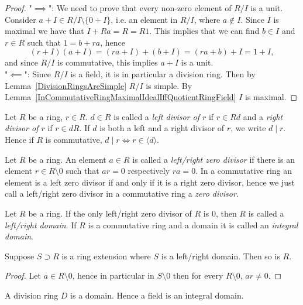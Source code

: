 \begin{proof}
    "$\implies$": We need to prove that every non-zero element of $R/I$ is a unit. Consider $a + I \in R/I\setminus \{0+I\}$, i.e. an element in $R/I$, where $a \notin I$. Since $I$ is maximal we have that $I+Ra = R = R1$. This implies that we can find $b\in I$ and $r \in R$ such that $1 = b + ra$, hence
    $$(r+I)(a+I) = (ra + I) + (b+I) = (ra+b)+I = 1 + I,$$
    and since $R/I$ is commutative, this implies $a+I$ is a unit.\\
    "$\impliedby$": Since $R/I$ is a field, it is in particular a division ring. Then by Lemma~\ref{DivisionRingsAreSimple} $R/I$ is simple. By Lemma~\ref{InCommutativeRingMaximalIdealIffQuotientRingField} $I$ is maximal.  
\end{proof}
\begin{definition}
    Let $R$ be a ring, $r\in R$. $d\in R$ is called a \textit{left divisor of $r$} if $r\in Rd$ and a \textit{right divisor of $r$} if $r\in dR$. If $d$ is both a left and a right divisor of $r$, we write $d\mid r$. Hence if $R$ is commutative, $d\mid r \iff r\in \langle d\rangle$.
\end{definition}
\begin{definition}
    Let $R$ be a ring. An element $a\in R$ is called a \textit{left/right zero divisor} if there is an element $r\in R\setminus 0$ such that $ar = 0$ respectively $ra = 0$. In a commutative ring an element is a left zero divisor if and only if it is a right zero divisor, hence we just call a left/right zero divisor in a commutative ring a \textit{zero divisor}.  
\end{definition}
\begin{definition}
    Let $R$ be a ring. If the only left/right zero divisor of $R$ is $0$, then $R$ is called a \textit{left/right domain}. If $R$ is a commutative ring and a domain it is called an \textit{integral domain}. 
\end{definition}
\begin{lemma}\label{SubringOfIDIsID}
    Suppose $S\supset R$ is a ring extension where $S$ is a left/right domain. Then so is $R$.
\end{lemma}
\begin{proof}
    Let $a\in R\setminus 0$, hence in particular in $S\setminus 0$ then for every $R\setminus 0$, $ar\neq0$. 
\end{proof}
\begin{proposition}
    A division ring $D$ is a domain. Hence a field is an integral domain.
\end{proposition}

